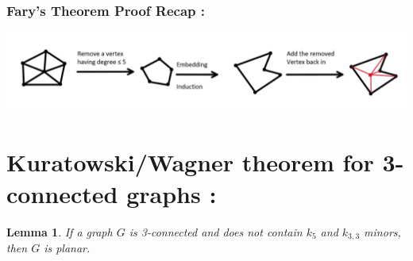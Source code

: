 \documentclass{article}
\newtheorem{lemma}{Lemma}
\begin{document}
    \subsubsection*{Fary's Theorem Proof Recap : }
    \centerline{\includegraphics[width=7in]{Images/Fary.jpg}} 
    \newpage
    \section*{Kuratowski/Wagner theorem for 3-connected graphs : }\begin{lemma}
        If a graph $G$ is 3-connected and does not contain $k_{5}$ and $k_{3,3}$ minors, then $G$ is planar. 
    \end{lemma}
\end{document}
